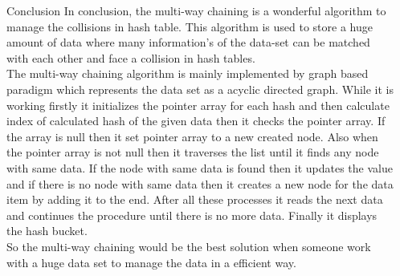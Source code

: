 \documentclass[final]{beamer}
\newlength{\sepwidth}
\newlength{\colwidth}
\newcommand{\separatorcolumn}{\begin{column}{\sepwidth}\end{column}}
\begin{document}
\begin{frame}[t]
\begin{columns}[t]
\begin{column}{\colwidth}
			\begin{alertblock}{Conclusion}
			\justifying
             In conclusion, the multi-way chaining is a wonderful algorithm to manage the collisions in hash table. This algorithm is used to store a huge amount of data where many information's of the data-set can be matched with each other and face a collision in hash tables.\\
The multi-way chaining algorithm is mainly implemented by graph based paradigm which represents the data set as a acyclic directed graph. While it is working firstly it initializes the pointer array for each hash and then calculate index of calculated hash of the given data then it checks the pointer array. If the array is null then it set pointer array to a new created node. Also when the pointer array is not null then it traverses the list until it finds any node with same data. If the node with same data is found then it updates the value and if there is no node with same data then it creates a new node for the data item by adding it to the end. After all these processes it reads the next data and continues the procedure until there is no more data. Finally it displays the hash bucket.\\
So the multi-way chaining would be the best solution when someone work with a huge data set to manage the data in a efficient way.

             
			\end{alertblock}
		\end{column}
		
		\separatorcolumn
	\end{columns}
    \end{frame}
\end{document}
